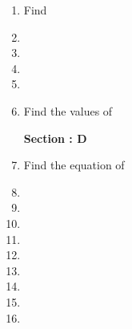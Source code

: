 \documentclass[12pt,a4paper]{article}
\begin{document}
\begin {enumerate}


\begin{center}

\textbf {Section : C}

\end{center}

\item Find 

\item

\item

\item

\item

\item Find the values of 



\begin{center}

\textbf {Section : D}

\end{center}

\item Find the equation of

\item

\item

\item

\item

\item

\item 

\item

\item

\item

\end{enumerate}

\end{document}
